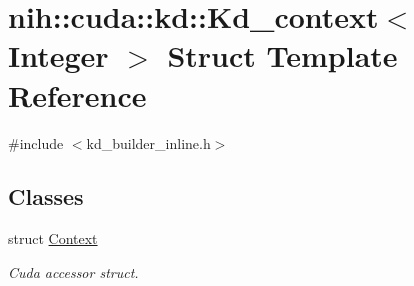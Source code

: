 \hypertarget{structnih_1_1cuda_1_1kd_1_1_kd__context}{
\section{nih\-:\-:cuda\-:\-:kd\-:\-:\-Kd\-\_\-context$<$ \-Integer $>$ \-Struct \-Template \-Reference}
\label{structnih_1_1cuda_1_1kd_1_1_kd__context}
}


{\ttfamily \#include $<$kd\-\_\-builder\-\_\-inline.\-h$>$}

\subsection*{\-Classes}
\begin{DoxyCompactItemize}
\item 
struct \hyperlink{structnih_1_1cuda_1_1kd_1_1_kd__context_1_1_context}{\-Context}
\begin{DoxyCompactList}\small\item\em \-Cuda accessor struct. \end{DoxyCompactList}\end{DoxyCompactItemize}
